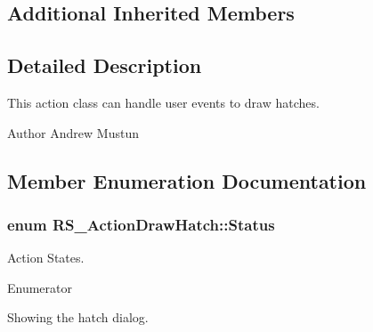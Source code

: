 \subsection*{Additional Inherited Members}


\subsection{Detailed Description}
This action class can handle user events to draw hatches.

\begin{DoxyAuthor}{Author}
Andrew Mustun 
\end{DoxyAuthor}


\subsection{Member Enumeration Documentation}
\hypertarget{classRS__ActionDrawHatch_a92f87652a726cb5b495530954c83881c}{
\subsubsection[{Status}]{\setlength{\rightskip}{0pt plus 5cm}enum {\bf R\-S\-\_\-\-Action\-Draw\-Hatch\-::\-Status}}}\label{classRS__ActionDrawHatch_a92f87652a726cb5b495530954c83881c}
Action States. \begin{Desc}
\item[Enumerator]\par
\begin{description}
\item[{\em 
\hypertarget{classRS__ActionDrawHatch_a92f87652a726cb5b495530954c83881ca279a3bad2dbbb5469f5f66621f1c3f5e}{Show\-Dialog}\label{classRS__ActionDrawHatch_a92f87652a726cb5b495530954c83881ca279a3bad2dbbb5469f5f66621f1c3f5e}
}]Showing the hatch dialog. \end{description}
\end{Desc}


